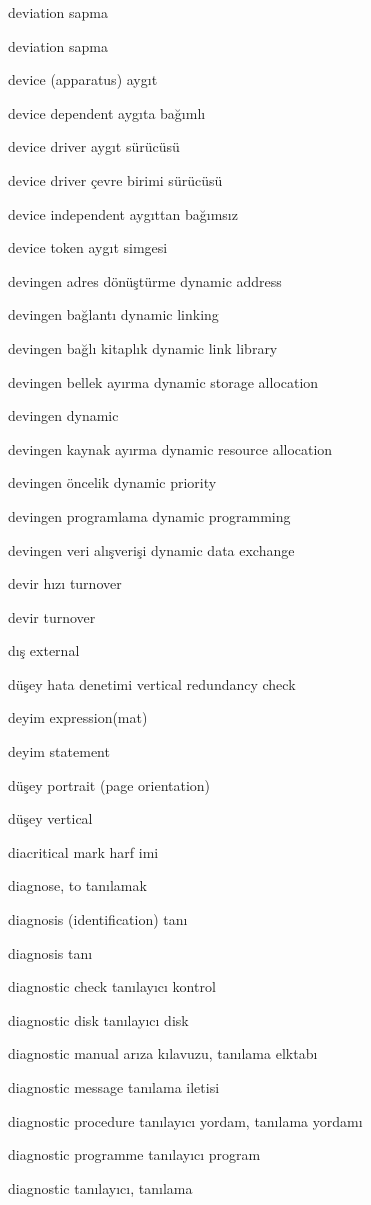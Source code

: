 \documentclass[12pt,fleqn]{article}\usepackage{../../common}
\begin{document}
deviation sapma

deviation sapma

device (apparatus) aygıt

device dependent aygıta bağımlı

device driver aygıt sürücüsü

device driver çevre birimi sürücüsü

device independent aygıttan bağımsız

device token aygıt simgesi

devingen adres dönüştürme dynamic address

devingen bağlantı dynamic linking

devingen bağlı kitaplık dynamic link library

devingen bellek ayırma dynamic storage allocation

devingen dynamic

devingen kaynak ayırma dynamic resource allocation

devingen öncelik dynamic priority

devingen programlama dynamic programming

devingen veri alışverişi dynamic data exchange

devir hızı turnover

devir turnover

dış external

düşey hata denetimi vertical redundancy check

deyim expression(mat)

deyim statement

düşey portrait (page orientation)

düşey vertical

diacritical mark harf imi

diagnose, to tanılamak

diagnosis (identification) tanı

diagnosis tanı

diagnostic check tanılayıcı kontrol

diagnostic disk tanılayıcı disk

diagnostic manual arıza kılavuzu, tanılama elktabı

diagnostic message tanılama iletisi

diagnostic procedure tanılayıcı yordam, tanılama yordamı

diagnostic programme tanılayıcı program

diagnostic tanılayıcı, tanılama
\end{document}
